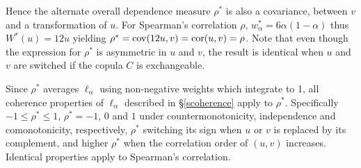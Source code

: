 \documentclass[authoryear]{elsarticle}
\newcommand{\cov}{{\rm cov}}
\newcommand{\cor}{\mathrm{cor}}
\newcommand{\sref}[1]{\S\ref{#1}}
\begin{document}
Hence the alternate overall dependence measure $\rho^*$ is also a covariance, between $v$ and a transformation of $u$. For Spearman's correlation $\rho$, $w^*_\alpha=6\alpha(1-\alpha)$ thus $W^*(u)=12u$ yielding $\rho^*=\cov(12u,v)=\cor(u,v)=\rho$. Note that even though the expression for $\rho^*$ is asymmetric in $u$ and $v$, the result is identical when $u$ and $v$ are switched if the copula $C$ is exchangeable.

Since $\rho^*$ averages $\ell_\alpha$ using non-negative weights which integrate to 1, all coherence properties of $\ell_\alpha$ described in \sref{scoherence} apply to $\rho^*$. Specifically $-1\le\rho^*\le 1$, $\rho^*=-1$, $0$ and $1$ under countermonotonicity, independence and comonotonicity, respectively, $\rho^*$ switching its sign when $u$ or $v$ is replaced by its complement, and higher $\rho^*$ when the correlation order of $(u,v)$ increases. Identical properties apply to Spearman's correlation.
\end{document}
